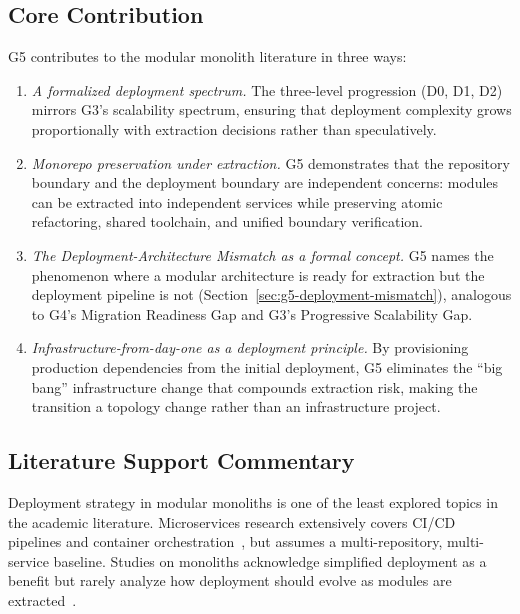 \subsection*{Core Contribution}

G5 contributes to the modular monolith literature in three ways:

\begin{enumerate}[itemsep=8pt,topsep=2pt]
  \item \emph{A formalized deployment spectrum.} The three-level progression (D0, D1, D2) mirrors G3's scalability spectrum, ensuring that deployment complexity grows proportionally with extraction decisions rather than speculatively.

  \item \emph{Monorepo preservation under extraction.} G5 demonstrates that the repository boundary and the deployment boundary are independent concerns: modules can be extracted into independent services while preserving atomic refactoring, shared toolchain, and unified boundary verification.

  \item \emph{The Deployment-Architecture Mismatch as a formal concept.} G5 names the phenomenon where a modular architecture is ready for extraction but the deployment pipeline is not (Section~\ref{sec:g5-deployment-mismatch}), analogous to G4's Migration Readiness Gap and G3's Progressive Scalability Gap.

  \item \emph{Infrastructure-from-day-one as a deployment principle.} By provisioning production dependencies from the initial deployment, G5 eliminates the ``big bang'' infrastructure change that compounds extraction risk, making the transition a topology change rather than an infrastructure project.
\end{enumerate}

\subsection*{Literature Support Commentary}

Deployment strategy in modular monoliths is one of the least explored topics in the academic literature. Microservices research extensively covers CI/CD pipelines and container orchestration~\cite{arya2024beyond}, but assumes a multi-repository, multi-service baseline. Studies on monoliths acknowledge simplified deployment as a benefit but rarely analyze how deployment should evolve as modules are extracted~\cite{montesi2021sliceable, gravanis2021dont}.

